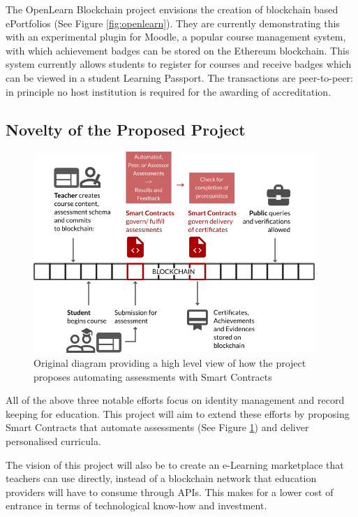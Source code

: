 The OpenLearn Blockchain project envisions the creation of blockchain based ePortfolios (See Figure
\ref{fig:openlearn}). They are currently demonstrating this with an experimental plugin for Moodle,
a popular course management system, with which achievement badges can be stored on the Ethereum
blockchain. This system currently allows students to register for courses and receive badges which
can be viewed in a student Learning Passport. The transactions are peer-to-peer: in principle no
host institution is required for the awarding of accreditation. \citep{sharples2016blockchain}

\subsection{Novelty of the Proposed Project}

\begin{figure}[!ht]
	\centering
	\includegraphics[width=0.95\textwidth]{moocon}
	\caption[Assessment Smart Contracts Concept]
	{Original diagram providing a high level view of how the project proposes automating assessments
		with Smart Contracts}
	\label{fig:moocon_assess}
\end{figure}

All of the above three notable efforts focus on identity management and record keeping for education.
This project will aim to extend these efforts by proposing Smart Contracts that automate assessments
(See Figure \ref{fig:moocon_assess}) and deliver personalised curricula.

The vision of this project will also be to create an e-Learning marketplace that teachers can use directly,
instead of a blockchain network that education providers will have to consume through APIs. This makes for a
lower cost of entrance in terms of technological know-how and investment.


